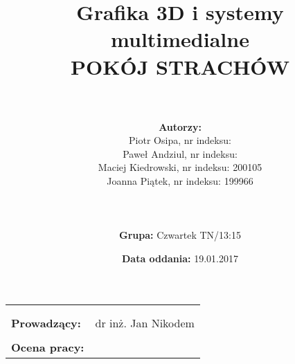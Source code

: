\documentclass{article}
\title{Grafika 3D i systemy multimedialne\\
	\vspace{5mm}
	\textbf{POKÓJ STRACHÓW}}
\author{\\
	\\\textbf{Autorzy:}
	\\Piotr Osipa, nr indeksu:
	\\Paweł Andziul, nr indeksu: 
	\\Maciej Kiedrowski, nr indeksu: 200105
	\\Joanna Piątek, nr indeksu: 199966
	\\\\
	\\
	\\\textbf{Grupa:} Czwartek TN/13:15}
\date{\textbf{Data oddania:} 19.01.2017}
\begin{document}
\maketitle %

\begin{center}
\begin{tabular}{l r}
\\\\\\
\textbf{Prowadzący:} & dr inż. Jan Nikodem \\
\\\textbf{Ocena pracy:} &  %
\end{tabular}
\end{center}
 
\newpage
\tableofcontents 	%
\newpage


\newpage



\end{document}
